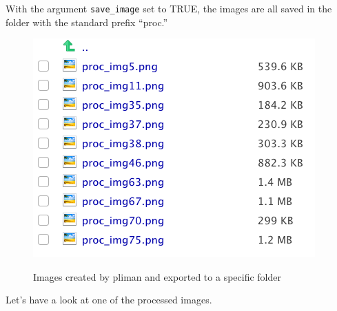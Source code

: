 \documentclass[
  letterpaper,
  DIV=11,
  numbers=noendperiod]{scrreprt}
\begin{document}
With the argument \texttt{save\_image} set to TRUE, the images are all
saved in the folder with the standard prefix ``proc.''

\begin{figure}

{\centering 

\href{fig_folder}{\includegraphics{./imgs/pliman2.png}}

}

\caption{Images created by pliman and exported to a specific folder}

\end{figure}

Let's have a look at one of the processed images.
\end{document}
